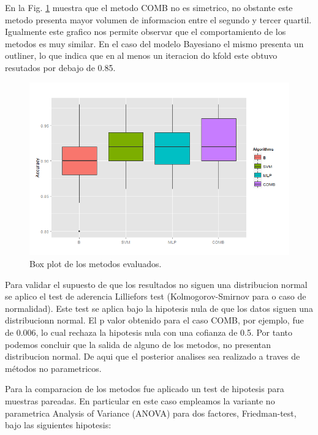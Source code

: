 \documentclass[12pt]{article}
\begin{document}
En la Fig. \ref{fig:boxplot_acc} muestra que el metodo COMB no es simetrico, no obstante este metodo presenta mayor volumen de informacion entre el segundo y tercer quartil. Igualmente este grafico nos permite observar que el comportamiento de los metodos es muy similar. En el caso del modelo Bayesiano el mismo presenta un outliner, lo que indica que en al menos un iteracion do kfold este obtuvo resutados por debajo de 0.85. 

\begin{figure}[!h]
\centering
\includegraphics[width=4.5in]{../out/boxplot-errors.png}
\caption{Box plot de los metodos evaluados.}
\label{fig:boxplot_acc}
\end{figure}  



Para validar el supuesto de que los resultados no siguen una distribucion normal se aplico el test de aderencia  Lilliefors test (Kolmogorov-Smirnov para o caso de normalidad). Este test se aplica bajo la hipotesis nula de que los datos siguen una distribucionn normal. El p valor obtenido para el caso COMB, por ejemplo, fue de 0.006, lo cual rechaza la hipotesis nula con una cofianza de 0.5. Por tanto podemos concluir que la salida de alguno de los metodos, no presentan distribucion normal. De aqui que el posterior analises sea realizado a traves de métodos no parametricos. 


Para la comparacion de los metodos fue aplicado un test de hipotesis para muestras pareadas. En particular en este caso empleamos la variante no parametrica Analysis of Variance (ANOVA) para dos factores, Friedman-test, bajo las siguientes hipotesis:
\end{document}
